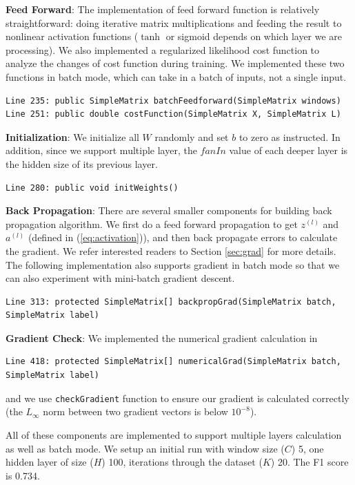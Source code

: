 \documentclass[letterpaper]{article}
\begin{document}
\textbf{Feed Forward}: The implementation of feed forward function is relatively straightforward: doing iterative matrix multiplications and feeding the result to  nonlinear activation functions ($\tanh$ or sigmoid depends on which layer we are processing). We also implemented a regularized likelihood cost function to analyze the changes of cost function during training.
We implemented these two functions in batch mode,
which can take in a batch of inputs, not a single input.
\begin{verbatim}
Line 235: public SimpleMatrix batchFeedforward(SimpleMatrix windows)
Line 251: public double costFunction(SimpleMatrix X, SimpleMatrix L)
\end{verbatim}

\textbf{Initialization}: We initialize all $W$ randomly and set $b$ to zero as instructed. In addition, since we support multiple layer, the $fanIn$ value of each deeper layer is the hidden size of its previous layer.
\begin{verbatim}
Line 280: public void initWeights()
\end{verbatim}
\textbf{Back Propagation}: There are several smaller components for building back propagation algorithm.
We first do a feed forward propagation to get $z^{(l)}$ and $a^{(l)}$ (defined in (\ref{eq:activation})), and then back propagate errors to calculate the gradient. We refer interested readers to Section \ref{sec:grad} for more details. The following implementation also supports gradient in batch mode so that we can also experiment with mini-batch gradient descent.
\begin{verbatim}
Line 313: protected SimpleMatrix[] backpropGrad(SimpleMatrix batch, SimpleMatrix label)
\end{verbatim}

\textbf{Gradient Check}: 
We implemented the numerical gradient calculation in
\begin{verbatim}
Line 418: protected SimpleMatrix[] numericalGrad(SimpleMatrix batch, SimpleMatrix label)
\end{verbatim}
and we use \texttt{checkGradient} function to ensure our gradient is calculated correctly (the $L_\infty$ norm between two gradient vectors is below $10^{-8}$).

\vspace{0.1cm}

All of these components are implemented to support multiple layers calculation as well as batch mode. We setup an initial run with window size ($C$) 5, one hidden layer of size ($H$) 100, iterations through the dataset ($K$) 20. The F1 score is 0.734.
\end{document}
